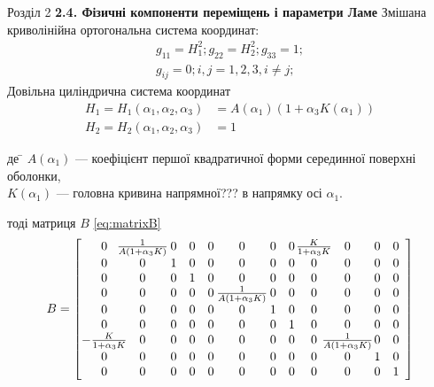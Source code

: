 \documentclass[8pt]{beamer}
\numberwithin{figure}{section}
\numberwithin{equation}{section}
\begin{document}
\begin{frame}{Розділ 2}
\textbf{2.4. Фізичні компоненти переміщень і параметри Ламе}
\linebreak
\linebreak
Змішана криволінійна ортогональна система координат:
\begin{align}
g_{11}=H_1^2; g_{22}=H_2^2; g_{33}=1; \\
g_{ij}=0; i,j=1,2,3, i \ne j;
\end{align}
Довільна циліндрична система координат
\begin{align}
H_1 = H_1 \left( \alpha_1, \alpha_2, \alpha_3 \right) &= A \left( \alpha_1 \right) \left( 1+ \alpha_3 K \left( \alpha_1 \right) \right)  \\
H_2 = H_2 \left( \alpha_1, \alpha_2, \alpha_3 \right) &= 1
\end{align}

\begin{tabbing}
де \= $  A \left( \alpha_1 \right)$ --- коефіцієнт першої квадратичної форми серединної поверхні оболонки,\\
\> $K \left( \alpha_1 \right)$ --- головна кривина напрямної??? в напрямку осі $\alpha_1$.
\end{tabbing}
тоді матриця $B$ \eqref{eq:matrixB}
\begin{equation}
\begin{aligned}
B=
\left[\begin{array}{@{}c@{\hspace{-8pt}}c@{\hspace{2pt}}ccc@{\hspace{2pt}}c@{\hspace{2pt}}cc@{\hspace{1pt}}c@{\hspace{-8pt}}c@{\hspace{1pt}}cc}
0 & \frac{1}{A \left(1+ \alpha_{3} K \right)} & 0 & 0 & 0 & 0 & 0 & 0 & \frac{K}{1+ \alpha_{3} K } & 0 & 0 & 0\\0 & 0 & 1 & 0 & 0 & 0 & 0 & 0 & 0 & 0 & 0 & 0\\0 & 0 & 0 & 1 & 0 & 0 & 0 & 0 & 0 & 0 & 0 & 0\\0 & 0 & 0 & 0 & 0 & \frac{1}{A \left(1+ \alpha_{3} K \right)} & 0 & 0 & 0 & 0 & 0 & 0\\0 & 0 & 0 & 0 & 0 & 0 & 1 & 0 & 0 & 0 & 0 & 0\\0 & 0 & 0 & 0 & 0 & 0 & 0 & 1 & 0 & 0 & 0 & 0\\- \frac{K}{1+ \alpha_{3} K } & 0 & 0 & 0 & 0 & 0 & 0 & 0 & 0 & \frac{1}{A \left(1+ \alpha_{3} K \right)} & 0 & 0\\0 & 0 & 0 & 0 & 0 & 0 & 0 & 0 & 0 & 0 & 1 & 0\\0 & 0 & 0 & 0 & 0 & 0 & 0 & 0 & 0 & 0 & 0 & 1\end{array}\right]
\end{aligned}
\end{equation}

\end{frame}
\end{document}

